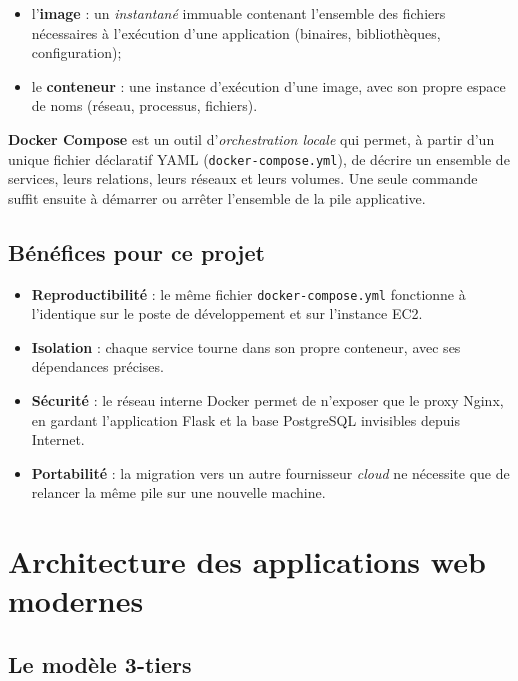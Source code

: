 \begin{itemize}
  \item l'\textbf{image} : un \emph{instantané} immuable contenant
        l'ensemble des fichiers nécessaires à l'exécution d'une
        application (binaires, bibliothèques, configuration);
  \item le \textbf{conteneur} : une instance d'exécution d'une image,
        avec son propre espace de noms (réseau, processus, fichiers).
\end{itemize}

\textbf{Docker Compose} est un outil d'\emph{orchestration locale} qui
permet, à partir d'un unique fichier déclaratif YAML
(\texttt{docker-compose.yml}), de décrire un ensemble de services, leurs
relations, leurs réseaux et leurs volumes. Une seule commande suffit
ensuite à démarrer ou arrêter l'ensemble de la pile applicative.

\subsection{Bénéfices pour ce projet}

\begin{itemize}
  \item \textbf{Reproductibilité} : le même fichier
        \texttt{docker-compose.yml} fonctionne à l'identique sur le
        poste de développement et sur l'instance EC2.
  \item \textbf{Isolation} : chaque service tourne dans son propre
        conteneur, avec ses dépendances précises.
  \item \textbf{Sécurité} : le réseau interne Docker permet de
        n'exposer que le proxy Nginx, en gardant l'application Flask et
        la base PostgreSQL invisibles depuis Internet.
  \item \textbf{Portabilité} : la migration vers un autre fournisseur
        \emph{cloud} ne nécessite que de relancer la même pile sur une
        nouvelle machine.
\end{itemize}

\section{Architecture des applications web modernes}

\subsection{Le modèle 3-tiers}

